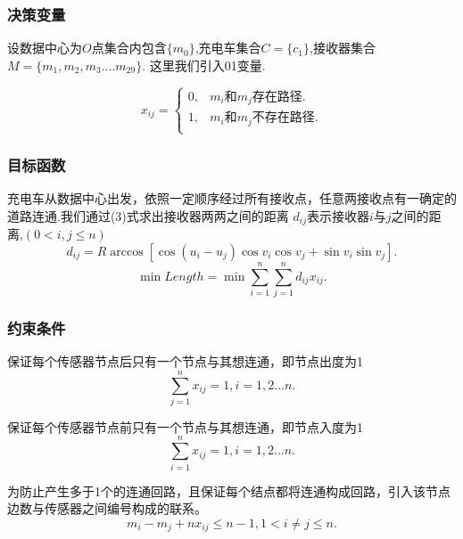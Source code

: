 \documentclass{whutmod}
\begin{document}
\subsubsection{决策变量}
设数据中心为$O$点集合内包含$\{m_0\}$,充电车集合$C= \{c_{1}\}$,接收器集合$M=\{m_{1},m_{2},m_{3}....m_{29}\}$.
这里我们引入01变量.

\begin{equation}
	x_{ij}=\begin{cases} 
		0,&\text{$m_i$和$m_j$存在路径.} \\
		1,&\text{$m_i$和$m_j$不存在路径.} \\
	\end{cases}
\end{equation}


\subsubsection{目标函数}
充电车从数据中心出发，依照一定顺序经过所有接收点，任意两接收点有一确定的道路连通.我们通过(3)式求出接收器两两之间的距离
$d_{ij}$表示接收器$i$与$j$之间的距离,$(0<i,j\leq n )$
\begin{equation}
	d_{ij}=R \arccos \left[\cos (u_{i}-u_{j}) \cos v_{i} \cos v_{j}+\sin v_{i} \sin v_{j}\right].
\end{equation}
\begin{equation}
	\min Length=\min\sum_{i=1}^{n}\sum_{j=1}^nd_{ij}x_{ij}.
\end{equation}

\subsubsection{约束条件}
保证每个传感器节点后只有一个节点与其想连通，即节点出度为1
\begin{equation}
	\sum_{j=1}^{n} x_{ij} = 1,i=1,2...n.
\end{equation}

保证每个传感器节点前只有一个节点与其想连通，即节点入度为1
\begin{equation}
	\sum_{i=1}^{n} x_{ij} = 1,i=1,2...n.
\end{equation}

为防止产生多于1个的连通回路，且保证每个结点都将连通构成回路，引入该节点边数与传感器之间编号构成的联系。
\begin{equation}
	m_i-m_j+nx_{ij}\le n-1,1<i\ne j\le n.
\end{equation}
\end{document}
